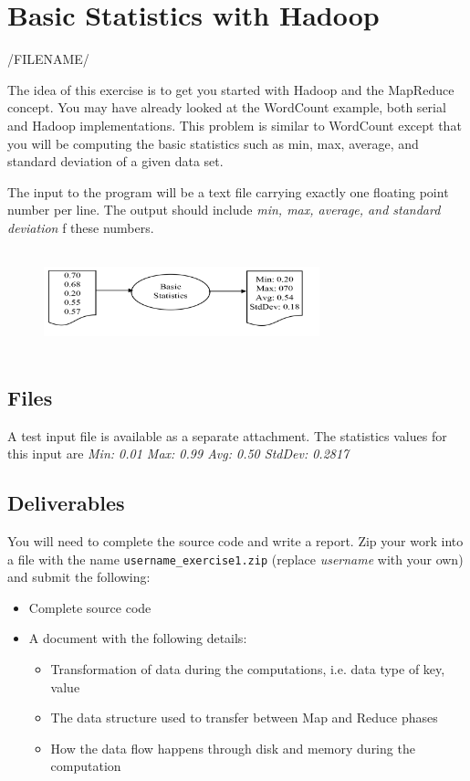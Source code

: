 
\section{Basic Statistics with Hadoop}       
/FILENAME/


The idea of this exercise is to get you started with Hadoop and the
MapReduce concept. You may have already looked at the WordCount
example, both serial and Hadoop implementations. This problem is
similar to WordCount except that you will be computing the basic
statistics such as min, max, average, and standard deviation of a
given data set.

The input to the program will be a text file carrying exactly one
floating point number per line. The output should include \textit{min,
  max, average, and standard deviation} f these numbers.

\begin{figure}[!htbp]
\includegraphics[width=8cm,height=3cm]{section/icloud/assignment/exercise1/p1example.png}
\centering
\end{figure}

\subsection{Files}

A test input file is available as a separate attachment.  The
statistics values for this input are \textit{Min: 0.01 Max: 0.99 Avg:
  0.50 StdDev: 0.2817}


\subsection{Deliverables}

You will need to complete the source code and write a report. Zip your
work into a file with the name \verb|username_exercise1.zip| (replace
\textit{username} with your own) and submit the following:

\begin{itemize}
\item Complete source code
\item A document with the following details:

  \begin{itemize}
  \item	Transformation of data during the computations, i.e. data type of key, value
  \item	The data structure used to transfer between Map and Reduce phases
  \item	How the data flow happens through disk and memory during the computation
  \end{itemize}

\end{itemize}

